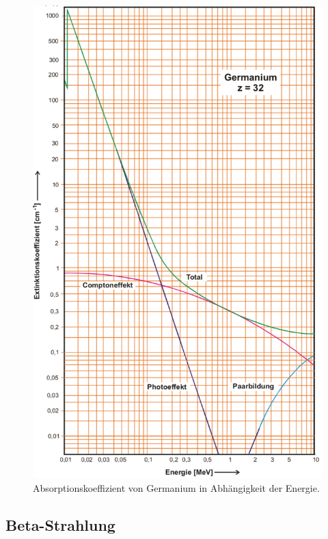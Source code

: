 \begin{figure}[H]
    \centering
    \includegraphics[scale=0.5]{Theorie/Germanium.pdf}
    \caption{Absorptionskoeffizient von Germanium in Abhängigkeit der Energie.}
    \label{fig:Germanium}
\end{figure}

\subsection{Beta-Strahlung}

